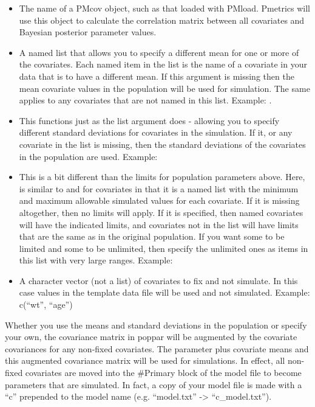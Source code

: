 \documentclass[a4paper]{book}
\begin{document}
\begin{Arguments}
\begin{ldescription}
\begin{itemize}
\item{}  The name of a PMcov object, such as that loaded with PMload. 
Pmetrics will use this object to calculate the correlation matrix between all covariates and Bayesian posterior parameter values.
\item{}  A named list that allows you to specify a different mean for one or more of the covariates. Each named item in the list is 
the name of a covariate in your data that is to have a different mean. If this argument is missing then the mean covariate values in 
the population will be used for simulation. The same applies to any covariates that are not named in this list.  Example: .
\item{}  This functions just as the  list argument does - allowing you to specify different standard deviations for covariates in the simulation. 
If it, or any covariate in the  list is missing, then the standard deviations of the covariates in the population are used. Example: 
\item{}  This is a bit different than the limits for population parameters above.
Here,  is similar to  and  for covariates in that it is 
a named list with the minimum and maximum allowable simulated values for each covariate.  If it is
missing altogether, then no limits will apply.  If it is specified, then named covariates will have the
indicated limits, and covariates not in the list will have limits that are the same as in the
original population.  If you want some to be limited and some to be unlimited, then specify the
unlimited ones as items in this list with very large ranges.  Example: 
\item{}  A character vector (not a list) of covariates to fix and not simulate.  In this case
values in the template data file will be used and not simulated.  Example: c(``wt'', ``age'')

\end{itemize}
 
Whether you use the means and standard deviations in the population 
or specify your own, the covariance matrix in poppar will be augmented by the covariate covariances for any non-fixed covariates. 
The parameter plus covariate means and this augmented covariance matrix will be used for simulations. 
In effect, all non-fixed covariates are moved into the \#Primary block of the model file to become parameters that are simulated. 
In fact, a copy of your model file is made with a ``c'' prepended to the model name (e.g. ``model.txt'' -> ``c\_model.txt'').


\end{ldescription}
\end{Arguments}
\end{document}
